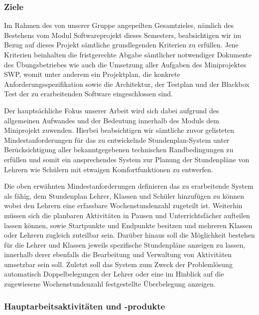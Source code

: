 \documentclass[fontsize=12pt,paper=a4,twoside]{scrartcl}
\begin{document}
\subsubsection{Ziele}

Im Rahmen des von unserer Gruppe angepeilten Gesamtzieles, nämlich des Bestehens vom Modul Softwareprojekt dieses Semesters, beabsichtigen wir im Bezug auf dieses Projekt sämtliche grundlegenden Kriterien zu erfüllen. Jene Kriterien beinhalten die fristgerechte Abgabe sämtlicher notwendiger Dokumente des Übungsbetriebes wie auch die Umsetzung aller Aufgaben des Miniprojektes SWP, womit unter anderem ein Projektplan, die konkrete Anforderungsspezifikation sowie die Architektur, der Testplan und der Blackbox Test der zu erarbeitenden Software eingeschlossen sind.

Der hauptsächliche Fokus unserer Arbeit wird sich dabei aufgrund des allgemeinen Aufwandes und der Bedeutung innerhalb des Moduls dem Miniprojekt zuwenden.
Hierbei beabsichtigen wir sämtliche zuvor gelisteten Mindestanforderungen für das zu entwickelnde Stundenplan-System unter Berücksichtigung aller bekanntgegebenen technischen Randbedingungen zu erfüllen und somit ein ansprechendes System zur Planung der Stundenpläne von Lehrern wie Schülern mit etwaigen Komfortfunktionen zu entwerfen.

Die oben erwähnten Mindestanforderungen definieren das zu erarbeitende System als fähig, dem Stundenplan Lehrer, Klassen und Schüler hinzufügen zu können wobei den Lehrern eine erfassbare Wochenstundenzahl zugeteilt ist.\newline
Weiterhin müssen sich die planbaren Aktivitäten in Pausen und Unterrichtsfächer aufteilen lassen können, sowie Startpunkte und Endpunkte besitzen und mehreren Klassen oder Lehrern zugleich zuteilbar sein.\newline
Darüber hinaus soll die Möglichkeit bestehen für die Lehrer und Klassen jeweils spezifische Stundenpläne anzeigen zu lassen, innerhalb derer ebenfalls die Bearbeitung und Verwaltung von Aktivitäten umsetzbar sein soll.\newline
Zuletzt soll das System zum Zweck der Problemlösung automatisch Doppelbelegungen der Lehrer oder eine im Hinblick auf die zugewiesene Wochenstundenzahl festgestellte Überbelegung anzeigen.

\subsubsection{Hauptarbeitsaktivitäten und -produkte}
\end{document}
